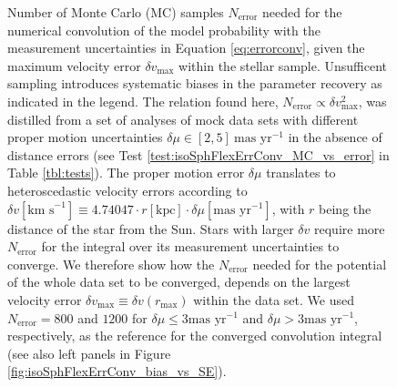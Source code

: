 \begin{figure}
\centering
{}
\caption{Number of Monte Carlo (MC) samples $N_\text{error}$ needed for the numerical convolution of the model probability with the measurement uncertainties in Equation \ref{eq:errorconv}, given the maximum velocity error $\delta v_\text{max}$ within the stellar sample. Unsufficent sampling introduces systematic biases in the parameter recovery as indicated in the legend. The relation found here, $N_\text{error} \propto \delta v_\text{max}^2$, was distilled from a set of analyses of mock data sets with different proper motion uncertainties $\delta \mu \in [2,5]~\text{mas yr}^{-1}$ in the absence of distance errors (see Test \ref{test:isoSphFlexErrConv_MC_vs_error} in Table \ref{tbl:tests}). The proper motion error $\delta \mu$ translates to heteroscedastic  velocity errors according to $\delta v [\text{km s}^{-1}] \equiv 4.74047 \cdot r[\text{kpc}] \cdot \delta \mu [\text{mas yr}^{-1}]$, with $r$ being the distance of the star from the Sun. Stars with larger $\delta v$ require more $N_\text{error}$ for the integral over its measurement uncertainties to converge. We therefore show how the $N_\text{error}$ needed for the potential \pdf{} of the whole data set to be converged, depends on the largest velocity error $\delta v_\text{max} \equiv \delta v(r_\text{max})$ within the data set. We used $N_\text{error} = 800$ and  $1200$ for $\delta \mu \leq 3 \text{mas yr}^{-1}$ and $\delta \mu > 3 \text{mas yr}^{-1}$, respectively, as the reference for the converged convolution integral (see also left panels in Figure \ref{fig:isoSphFlexErrConv_bias_vs_SE}).  }
\label{fig:isoSphFlexErrConv_MC_vs_error}
\end{figure}

